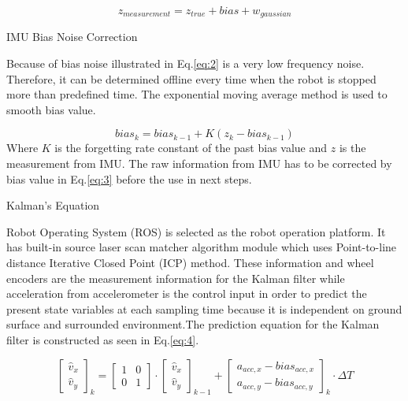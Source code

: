 \documentclass{llncs}
\newcommand{\md}[1]{\(#1\)}
\begin{document}
\begin{equation}
\label{eq:2}
z_{measurement} = z_{true} + bias + w_{gaussian}
\end{equation}

IMU Bias Noise Correction

Because of bias noise illustrated in Eq.\ref{eq:2} is a very low frequency noise. Therefore, it can be determined offline every time when the robot is stopped more than predefined time. The exponential moving average method is used to smooth bias value.

\begin{equation}
\label{eq:3}
bias_{k} = bias_{k-1} + K(z_{k} - bias_{k-1})
\end{equation}
Where \md{K} is the forgetting rate constant of the past bias value and \md{z} is the measurement from IMU. The raw information from IMU has to be corrected by bias value in Eq.\ref{eq:3} before the use in next steps.

Kalman's Equation

Robot Operating System (ROS) is selected as the robot operation platform. It has built-in source laser scan matcher algorithm module which uses Point-to-line distance Iterative Closed Point (ICP)\cite{icp1}\cite{icp2} method. These information and wheel encoders are the measurement information for the Kalman filter while acceleration from accelerometer is the control input in order to predict the present state variables at each sampling time because it is independent on ground surface and surrounded environment.The prediction equation for the Kalman filter is constructed as seen in Eq.\ref{eq:4}.

\begin{equation}
\label{eq:4}
\begin{bmatrix}
\hat{v}_{x} \\
\hat{v}_{y}
\end{bmatrix}_{k} = 
\begin{bmatrix}
1 & 0 \\
0 & 1 
\end{bmatrix} \cdot
\begin{bmatrix}
\hat{v}_{x} \\
\hat{v}_{y}
\end{bmatrix}_{k-1} +
\begin{bmatrix}
a_{acc,x}-bias_{acc,x} \\
a_{acc,y}-bias_{acc,y}
\end{bmatrix}_{k} \cdot \Delta T
\end{equation}
\end{document}
